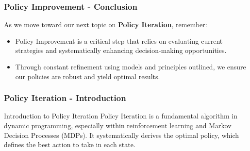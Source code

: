 \documentclass[aspectratio=169]{beamer}
\begin{document}
\begin{frame}[fragile]
    \frametitle{Policy Improvement - Conclusion}
    As we move toward our next topic on \textbf{Policy Iteration}, remember:
    \begin{itemize}
        \item Policy Improvement is a critical step that relies on evaluating current strategies and systematically enhancing decision-making opportunities.
        \item Through constant refinement using models and principles outlined, we ensure our policies are robust and yield optimal results.
    \end{itemize}
\end{frame}

\begin{frame}[fragile]
    \frametitle{Policy Iteration - Introduction}
    \begin{block}{Introduction to Policy Iteration}
        Policy Iteration is a fundamental algorithm in dynamic programming, especially within reinforcement learning and Markov Decision Processes (MDPs). It systematically derives the optimal policy, which defines the best action to take in each state.
    \end{block}
\end{frame}
\end{document}
